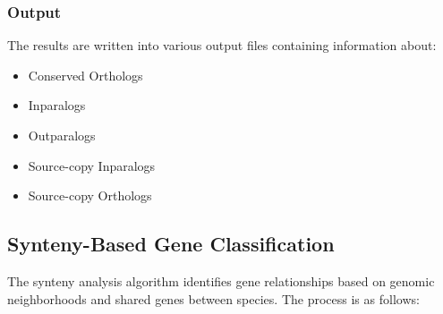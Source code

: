 \documentclass{article}
\begin{document}
\subsubsection{Output}
The results are written into various output files containing information about:
\begin{itemize}
    \item Conserved Orthologs
    \item Inparalogs
    \item Outparalogs
    \item Source-copy Inparalogs
    \item Source-copy Orthologs
\end{itemize}

\subsection{Synteny-Based Gene Classification}
The synteny analysis algorithm identifies gene relationships based on genomic neighborhoods and shared genes between species. The process is as follows:
\end{document}
